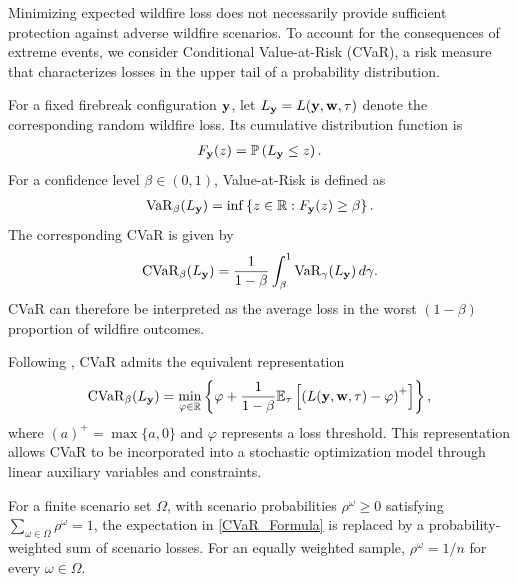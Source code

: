 \documentclass[a4paper,fleqn]{cas-sc}
\begin{document}
Minimizing expected wildfire loss does not necessarily
provide sufficient protection against adverse wildfire
scenarios. To account for the consequences of extreme
events, we consider Conditional Value-at-Risk (CVaR),
a risk measure that characterizes losses in the upper
tail of a probability distribution.

For a fixed firebreak configuration $\vb{y}$,
let $L_{\vb{y}}=L(\vb{y},\vb{w},\tau)$ denote
the corresponding random wildfire loss.
Its cumulative distribution function is
%
\begin{align*}
F_{\vb{y}}(z)
=
\mathbb{P}
\left(
L_{\vb{y}}\leq z
\right).
\end{align*}
%
For a confidence level $\beta\in(0,1)$,
Value-at-Risk is defined as
%
\begin{align*}
\operatorname{VaR}_{\beta}(L_{\vb{y}})
=
\inf\left\{
z\in\mathbb{R}:
F_{\vb{y}}(z)\geq\beta
\right\}.
\end{align*}
%
The corresponding CVaR is given by
%
\begin{align*}
\operatorname{CVaR}_{\beta}(L_{\vb{y}})
=
\frac{1}{1-\beta}
\int_{\beta}^{1}
\operatorname{VaR}_{\gamma}(L_{\vb{y}})
\,d\gamma.
\end{align*}
%
CVaR can therefore be interpreted as the average
loss in the worst $(1-\beta)$ proportion of
wildfire outcomes.

Following \citet{rockafellar2000optimization},
CVaR admits the equivalent representation
%
\begin{equation}
\label{CVaR_Formula}
\operatorname{CVaR}_{\beta}(L_{\vb{y}})
=
\min_{\varphi\in\mathbb{R}}
\left\{
\varphi+
\frac{1}{1-\beta}
\mathbb{E}_{\tau}
\left[
\left(
L(\vb{y},\vb{w},\tau)-\varphi
\right)^+
\right]
\right\},
\end{equation}
%
where $(a)^+=\max\{a,0\}$ and $\varphi$
represents a loss threshold. This representation
allows CVaR to be incorporated into a stochastic
optimization model through linear auxiliary
variables and constraints.

For a finite scenario set $\Omega$, with
scenario probabilities $\rho^\omega\geq 0$
satisfying
$\sum_{\omega\in\Omega}\rho^\omega=1$,
the expectation in
\eqref{CVaR_Formula} is replaced by a
probability-weighted sum of scenario losses.
For an equally weighted sample,
$\rho^\omega=1/n$ for every
$\omega\in\Omega$.


\end{document}
